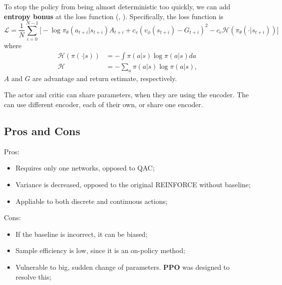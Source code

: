         To stop the policy from being almost deterministic too quickly, we can add \textbf{entropy bonus} at the loss function (\cite{pmlr-v48-mniha16}, \cite{WILLIAMS1991}).
        Specifically, the loss function is
        \begin{equation}
            \mathcal{L} = \frac{1}{N}\sum_{i = 0}^{N-1} \Big[-\log{\pi_\theta(a_{t+i}|s_{t+i})}A_{t+i} + c_v(v_\phi(s_{t+i}) - G_{t+i})^2 - c_e \mathcal{H}(\pi_\theta(\cdot|s_{t+i}))\Big]
        \end{equation}
        where 
        \begin{align}
            \mathcal{H}(\pi(\cdot|s)) &= -\int \pi(a|s)\log{\pi(a|s)}da \\
            \mathcal{H} &= -\sum_a \pi(a|s)\log{\pi(a|s)},
        \end{align}
        $A$ and $G$ are advantage and return estimate, respectively.

        The actor and critic can share parameters, when they are using the encoder. The can use different encoder, each of their own, or share one encoder.
    \subsection{Pros and Cons}
    Pros:
    \begin{itemize}
        \item Requires only one networks, opposed to QAC;
        \item Variance is decreased, opposed to the original REINFORCE without baseline;
        \item Appliable to both discrete and continuous actions;
    \end{itemize}
    Cons:
    \begin{itemize}
        \item If the baseline is incorrect, it can be biased;
        \item Sample efficiency is low, since it is an on-policy method;
        \item Vulnerable to big, sudden change of parameters. \textbf{PPO} was designed to resolve this;
    \end{itemize}